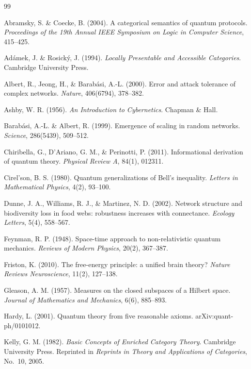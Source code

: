\documentclass[12pt,a4paper]{article}
\begin{document}
\begin{thebibliography}{99}

Abramsky, S. \& Coecke, B. (2004). A categorical semantics of quantum protocols. \textit{Proceedings of the 19th Annual IEEE Symposium on Logic in Computer Science}, 415--425.

Ad\'amek, J. \& Rosick\'y, J. (1994). \textit{Locally Presentable and Accessible Categories}. Cambridge University Press.

Albert, R., Jeong, H., \& Barab\'asi, A.-L. (2000). Error and attack tolerance of complex networks. \textit{Nature}, 406(6794), 378--382.

Ashby, W. R. (1956). \textit{An Introduction to Cybernetics}. Chapman \& Hall.

Barab\'asi, A.-L. \& Albert, R. (1999). Emergence of scaling in random networks. \textit{Science}, 286(5439), 509--512.

Chiribella, G., D'Ariano, G. M., \& Perinotti, P. (2011). Informational derivation of quantum theory. \textit{Physical Review A}, 84(1), 012311.

Cirel'son, B. S. (1980). Quantum generalizations of Bell's inequality. \textit{Letters in Mathematical Physics}, 4(2), 93--100.

Dunne, J. A., Williams, R. J., \& Martinez, N. D. (2002). Network structure and biodiversity loss in food webs: robustness increases with connectance. \textit{Ecology Letters}, 5(4), 558--567.

Feynman, R. P. (1948). Space-time approach to non-relativistic quantum mechanics. \textit{Reviews of Modern Physics}, 20(2), 367--387.

Friston, K. (2010). The free-energy principle: a unified brain theory? \textit{Nature Reviews Neuroscience}, 11(2), 127--138.

Gleason, A. M. (1957). Measures on the closed subspaces of a Hilbert space. \textit{Journal of Mathematics and Mechanics}, 6(6), 885--893.

Hardy, L. (2001). Quantum theory from five reasonable axioms. arXiv:quant-ph/0101012.

Kelly, G. M. (1982). \textit{Basic Concepts of Enriched Category Theory}. Cambridge University Press. Reprinted in \textit{Reprints in Theory and Applications of Categories}, No.~10, 2005.


\end{thebibliography}
\end{document}
